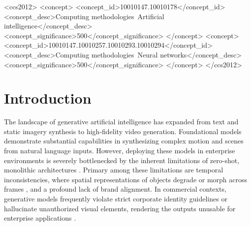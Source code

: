 \documentclass[sigconf]{acmart}
\begin{document}
\begin{CCSXML}
<ccs2012>
   <concept>
       <concept_id>10010147.10010178</concept_id>
       <concept_desc>Computing methodologies~Artificial intelligence</concept_desc>
       <concept_significance>500</concept_significance>
       </concept>
   <concept>
       <concept_id>10010147.10010257.10010293.10010294</concept_id>
       <concept_desc>Computing methodologies~Neural networks</concept_desc>
       <concept_significance>500</concept_significance>
       </concept>
 </ccs2012>
\end{CCSXML}



\maketitle

\section{Introduction}

The landscape of generative artificial intelligence has expanded from text and static imagery synthesis to high-fidelity video generation. Foundational models \cite{brooks2024video, veoteam2025} demonstrate substantial capabilities in synthesizing complex motion and scenes from natural language inputs. However, deploying these models in enterprise environments is severely bottlenecked by the inherent limitations of zero-shot, monolithic architectures \cite{zaharia2024shift}. Primary among these limitations are temporal inconsistencies, where spatial representations of objects degrade or morph across frames \cite{blattmann2023stable}, and a profound lack of brand alignment. In commercial contexts, generative models frequently violate strict corporate identity guidelines or hallucinate unauthorized visual elements, rendering the outputs unusable for enterprise applications \cite{ji2023survey}.
\end{document}
